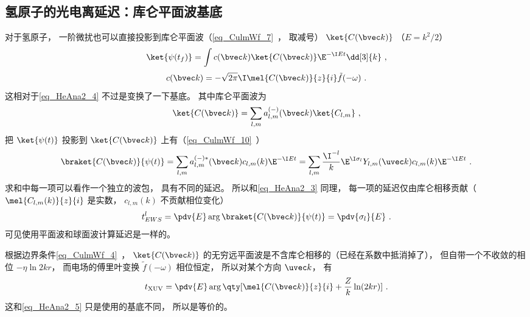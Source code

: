 \subsection{氢原子的光电离延迟：库仑平面波基底} \label{sub_HeAna2_2}
对于氢原子， 一阶微扰也可以直接投影到库仑平面波（\autoref{eq_CulmWf_7}~， 取减号） $\ket{C(\bvec k)}$ （$E = k^2/2$）
\begin{equation}
\ket{\psi(t_f)} = \int c(\bvec k)\ket{C(\bvec k)} \E^{-\I E t} \dd[3]{k}~,
\end{equation}
\begin{equation}
c(\bvec k) = -\sqrt{2\pi}\I\mel{C(\bvec k)}{z}{i} \tilde f(-\omega)~.
\end{equation}
这相对于\autoref{eq_HeAna2_4} 不过是变换了一下基底。 其中库仑平面波为
\begin{equation}
\ket{C(\bvec k)} = \sum_{l,m} a_{l,m}^{(-)}(\bvec k) \ket{C_{l,m}}~,
\end{equation}
把 $\ket{\psi(t)}$ 投影到 $\ket{C(\bvec k)}$ 上有（\autoref{eq_CulmWf_10}~）
\begin{equation}
\braket{C(\bvec k)}{\psi(t)} = \sum_{l,m} a_{l,m}^{(-)*}(\bvec k) c_{l,m}(k) \E^{-\I E t} 
= \sum_{l,m} \frac{\I^{-l}}{k} \E^{\I\sigma_l} Y_{l,m} (\uvec k) c_{l,m}(k) \E^{-\I E t}~.
\end{equation}
求和中每一项可以看作一个独立的波包， 具有不同的延迟。 所以和\autoref{eq_HeAna2_3} 同理， 每一项的延迟仅由库仑相移贡献（$\mel{C_{l,m}(k)}{z}{i}$ 是实数， $c_{l,m}(k)$ 不贡献相位变化）
\begin{equation}\label{eq_HeAna2_6}
t_{EWS}^l = \pdv{E} \arg\braket{C(\bvec k)}{\psi(t)} = \pdv{\sigma_l}{E}~.
\end{equation}
可见使用平面波和球面波计算延迟是一样的。

根据边界条件\autoref{eq_CulmWf_4}~， $\ket{C(\bvec k)}$ 的无穷远平面波是不含库仑相移的（已经在系数中抵消掉了）， 但自带一个不收敛的相位 $-\eta \ln 2kr$， 而电场的傅里叶变换 $\tilde f(-\omega)$ 相位恒定， 所以对某个方向 $\uvec k$， 有
\begin{equation}
t_\text{XUV} = \pdv{E} \arg\qty[\mel{C(\bvec k)}{z}{i} + \frac{Z}{k}\ln(2kr)]~.
\end{equation}
这和\autoref{eq_HeAna2_5} 只是使用的基底不同， 所以是等价的。

